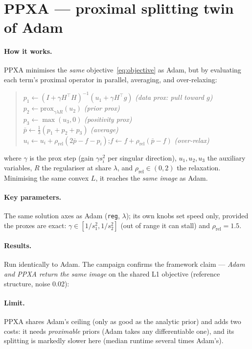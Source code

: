 \section{PPXA --- proximal splitting twin of Adam}
\label{sec:ppxa}

\paragraph{How it works.}
PPXA minimises the \emph{same} objective~\eqref{eq:objective} as Adam, but by evaluating each
term's proximal operator in parallel, averaging, and over-relaxing:
\begin{quote}
$p_1 \leftarrow (I+\gamma H^{\!\top}\!H)^{-1}(u_1+\gamma H^{\!\top} g)$ \hfill\textit{(data prox: pull toward $g$)}\\
$p_2 \leftarrow \mathrm{prox}_{\gamma\lambda R}(u_2)$ \hfill\textit{(prior prox)}\\
$p_3 \leftarrow \max(u_3,0)$ \hfill\textit{(positivity prox)}\\
$\bar p \leftarrow \tfrac13(p_1+p_2+p_3)$ \hfill\textit{(average)}\\
$u_i \leftarrow u_i + \rho_{\mathrm{rel}}(2\bar p - f - p_i)$;\quad $f \leftarrow f + \rho_{\mathrm{rel}}(\bar p - f)$ \hfill\textit{(over-relax)}
\end{quote}
\noindent where $\gamma$ is the prox step (gain $\gamma s_i^2$ per singular direction), $u_1,u_2,u_3$
the auxiliary variables, $R$ the regulariser at share $\lambda$, and $\rho_{\mathrm{rel}}\in(0,2)$
the relaxation. Minimising the same convex $L$, it reaches the \emph{same image} as Adam.

\paragraph{Key parameters.}
The same solution axes as Adam (\texttt{reg}, $\lambda$); its own knobs set speed only, provided the
proxes are exact: $\gamma\in[1/s_1^2,1/s_2^2]$ (out of range it can stall) and
$\rho_{\mathrm{rel}}=1.5$.

\paragraph{Results.}
Run identically to Adam. The campaign confirms the framework claim --- \emph{Adam and PPXA return
the same image} on the shared L1 objective (reference structure, noise 0.02):

\paragraph{Limit.}
PPXA shares Adam's ceiling (only as good as the analytic prior) and adds two costs: it needs
\emph{proximable} priors (Adam takes any differentiable one), and its splitting is markedly slower
here (median runtime several times Adam's).
